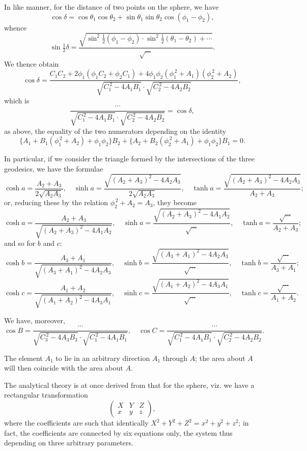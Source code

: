 \documentclass[11pt,a4paper]{book}
\begin{document}
\begin{art}
In like manner, for the distance of two points on the sphere, we have
\[
\cos\delta = \cos\theta_1\cos\theta_2 + \sin\theta_1\sin\theta_2\cos(\phi_1 - \phi_2),
\]
whence
\[
\sin\tfrac{1}{2}\delta = \frac{\sqrt{\sin^2\tfrac{1}{2}(\phi_1-\phi_2) \cdot \sin^2\tfrac{1}{2}(\theta_1-\theta_2) + \cdots}}{\sqrt{\cdots}}.
\]
We thence obtain
\[
\cos\delta = \frac{C_1C_2 + 2\phi_1(\phi_1C_2 + \phi_2C_1) + 4\phi_1\phi_2(\phi_1^{\,2} + A_1)(\phi_2^{\,2} + A_2)}{\sqrt{C_1^{\,2} - 4A_1B_1} \cdot \sqrt{C_2^{\,2} - 4A_2B_2}},
\]
which is
\[
\frac{\cdots}{\sqrt{C_1^{\,2} - 4A_1B_1} \cdot \sqrt{C_2^{\,2} - 4A_2B_2}} = \cos\delta,
\]
as above, the equality of the two numerators depending on the identity
\[
\{A_1 + B_1(\phi_1^{\,2} + A_2) + \phi_1\phi_2\}B_2 + \{A_2 + B_2(\phi_2^{\,2} + A_1) + \phi_1\phi_2\}B_1 = 0.
\]
\end{art}

\begin{art}
In particular, if we consider the triangle formed by the intersections of the three geodesics, we have the formulae
\[
\cosh a = \frac{A_2 + A_3}{2\sqrt{A_2A_3}}, \quad \sinh a = \frac{\sqrt{(A_2+A_3)^2 - 4A_2A_3}}{2\sqrt{A_2A_3}}, \quad \tanh a = \frac{\sqrt{(A_2+A_3)^2 - 4A_2A_3}}{A_2 + A_3};
\]
or, reducing these by the relation $\phi_2^{\,2} + A_2 = A_3$, they become
\[
\cosh a = \frac{A_2 + A_3}{\sqrt{(A_2+A_3)^2 - 4A_1A_2}}, \quad \sinh a = \frac{\sqrt{(A_2+A_3)^2 - 4A_1A_2}}{\sqrt{\cdots}}, \quad \tanh a = \frac{\sqrt{\cdots}}{A_2 + A_3};
\]
and so for $b$ and $c$:
\[
\cosh b = \frac{A_3 + A_1}{\sqrt{(A_3+A_1)^2 - 4A_2A_3}}, \quad \sinh b = \frac{\sqrt{(A_3+A_1)^2 - 4A_2A_3}}{\sqrt{\cdots}}, \quad \tanh b = \frac{\sqrt{\cdots}}{A_3 + A_1};
\]
\[
\cosh c = \frac{A_1 + A_2}{\sqrt{(A_1+A_2)^2 - 4A_3A_1}}, \quad \sinh c = \frac{\sqrt{(A_1+A_2)^2 - 4A_3A_1}}{\sqrt{\cdots}}, \quad \tanh c = \frac{\sqrt{\cdots}}{A_1 + A_2}.
\]

We have, moreover,
\[
\cos B = \frac{\cdots}{\sqrt{C_3^{\,2} - 4A_3B_3} \cdot \sqrt{C_1^{\,2} - 4A_1B_1}}, \quad
\cos C = \frac{\cdots}{\sqrt{C_1^{\,2} - 4A_1B_1} \cdot \sqrt{C_2^{\,2} - 4A_2B_2}}.
\]
\end{art}

\begin{art}
The element $A_1$ to lie in an arbitrary direction $A_1$ through $A$; the area about $A$ will then coincide with the area about $A$.

The analytical theory is at once derived from that for the sphere, viz. we have a rectangular transformation
\[
\begin{pmatrix} X & Y & Z \\ x & y & z \end{pmatrix},
\]
where the coefficients are such that identically $X^2 + Y^2 + Z^2 = x^2 + y^2 + z^2$; in fact, the coefficients are connected by six equations only, the system thus depending on three arbitrary parameters.
\end{art}
\end{document}
